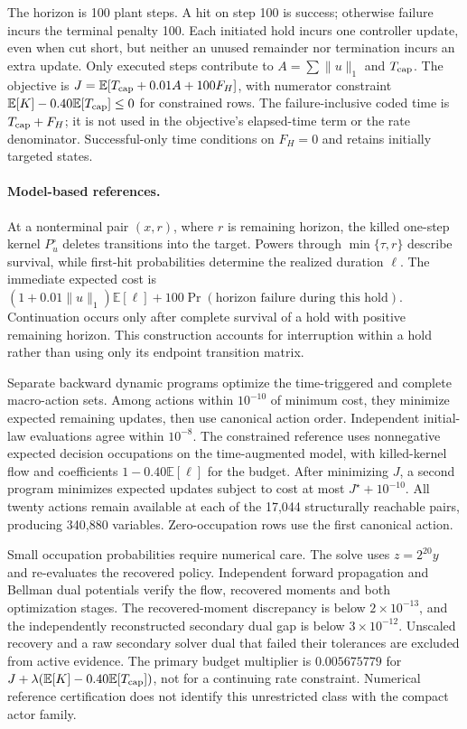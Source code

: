 \documentclass[11pt]{article}
\newcommand{\E}{\mathbb{E}}
\newcommand{\1}{\mathbf{1}}
\begin{document}
The horizon is 100 plant steps. A hit on step 100 is success; otherwise failure incurs the terminal penalty 100. Each initiated hold incurs one controller update, even when cut short, but neither an unused remainder nor termination incurs an extra update. Only executed steps contribute to $A=\sum\|u\|_1$ and $T_{\rm cap}$. The objective is $J=\E[T_{\rm cap}+0.01A+100F_H]$, with numerator constraint $\E[K]-0.40\E[T_{\rm cap}]\leq0$ for constrained rows. The failure-inclusive coded time is $T_{\rm cap}+F_H$; it is not used in the objective's elapsed-time term or the rate denominator. Successful-only time conditions on $F_H=0$ and retains initially targeted states.

\paragraph{Model-based references.}
At a nonterminal pair $(x,r)$, where $r$ is remaining horizon, the killed one-step kernel $P_u^\circ$ deletes transitions into the target. Powers through $\min\{\tau,r\}$ describe survival, while first-hit probabilities determine the realized duration $\ell$. The immediate expected cost is $(1+0.01\|u\|_1)\E[\ell]+100\Pr(\text{horizon failure during this hold})$. Continuation occurs only after complete survival of a hold with positive remaining horizon. This construction accounts for interruption within a hold rather than using only its endpoint transition matrix.

Separate backward dynamic programs optimize the time-triggered and complete macro-action sets. Among actions within $10^{-10}$ of minimum cost, they minimize expected remaining updates, then use canonical action order. Independent initial-law evaluations agree within $10^{-8}$. The constrained reference uses nonnegative expected decision occupations on the time-augmented model, with killed-kernel flow and coefficients $1-0.40\E[\ell]$ for the budget. After minimizing $J$, a second program minimizes expected updates subject to cost at most $J^\star+10^{-10}$. All twenty actions remain available at each of the 17,044 structurally reachable pairs, producing 340,880 variables. Zero-occupation rows use the first canonical action.

Small occupation probabilities require numerical care. The solve uses $z=2^{20}y$ and re-evaluates the recovered policy. Independent forward propagation and Bellman dual potentials verify the flow, recovered moments and both optimization stages. The recovered-moment discrepancy is below $2\times10^{-13}$, and the independently reconstructed secondary dual gap is below $3\times10^{-12}$. Unscaled recovery and a raw secondary solver dual that failed their tolerances are excluded from active evidence. The primary budget multiplier is $0.005675779$ for $J+\lambda(\E[K]-0.40\E[T_{\rm cap}])$, not for a continuing rate constraint. Numerical reference certification does not identify this unrestricted class with the compact actor family.
\end{document}
